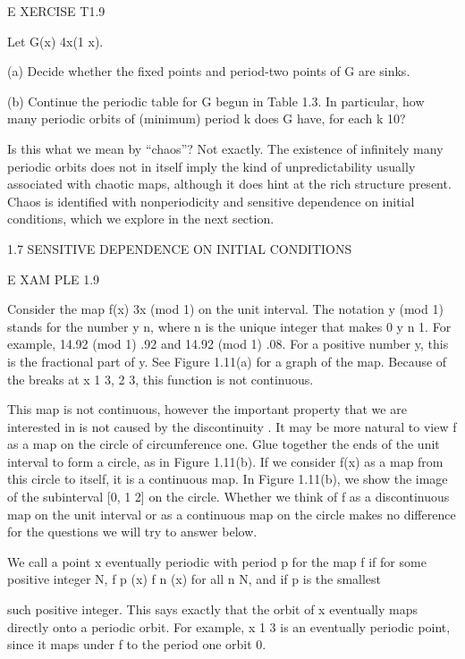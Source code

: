 \documentclass[12pt]{article}
\begin{document}
 

E XERCISE T1.9

Let G(x)  4x(1  x).

(a) Decide whether the fixed points and period-two points of G are sinks.

(b) Continue the periodic table for G begun in Table 1.3. In particular, how many periodic orbits of 
(minimum) period k does G have, for each k 10?

Is this what we mean by “chaos”? Not exactly. The existence of infinitely many periodic orbits does not in 
itself imply the kind of unpredictability usually associated with chaotic maps, although it does hint at 
the rich structure present. Chaos is identified with nonperiodicity and sensitive dependence on initial 
conditions, which we explore in the next section.

1.7 SENSITIVE DEPENDENCE ON INITIAL CONDITIONS

E XAM PLE 1.9

Consider the map f(x)  3x (mod 1) on the unit interval. The notation y (mod 1) stands for the number y n, 
where n is the unique integer that makes 0 y n    1. For example, 14.92 (mod 1)  .92 and 14.92 (mod 1)  
.08. For a positive number y, this is the fractional part of y. See Figure 1.11(a) for a graph of the map. 
Because of the breaks at x  1  3, 2  3, this function is not continuous.

This map is not continuous, however the important property that we are interested in is not caused by the 
discontinuity . It may be more natural to view f as a map on the circle of circumference one. Glue together 
the ends of the unit interval to form a circle, as in Figure 1.11(b). If we consider f(x) as a map from 
this circle to itself, it is a continuous map. In Figure 1.11(b), we show the image of the subinterval [0, 
1  2] on the circle. Whether we think of f as a discontinuous map on the unit interval or as a continuous 
map on the circle makes no difference for the questions we will try to answer below.

We call a point x eventually periodic with period p for the map f if for some positive integer N, f p (x)  
f n (x) for all n 
 N, and if p is the smallest

such positive integer. This says exactly that the orbit of x eventually maps directly onto a periodic 
orbit. For example, x  1  3 is an eventually periodic point, since it maps under f to the period one orbit 
0.

 
\end{document}
